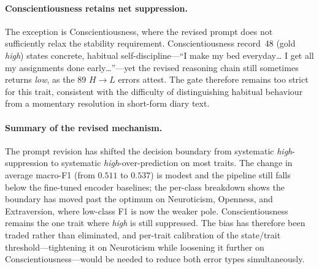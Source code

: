 \documentclass[../main.tex]{subfiles}
\begin{document}
\paragraph{Conscientiousness retains net suppression.}
The exception is Conscientiousness, where the revised prompt does not sufficiently
relax the stability requirement. Conscientiousness record~48 (gold \textit{high})
states concrete, habitual self-discipline---``I make my bed everyday\dots
I get all my assignments done early\dots''---yet the revised reasoning chain
still sometimes returns \textit{low}, as the $89$ $H{\to}L$ errors attest.
The gate therefore remains too strict for this trait, consistent with the
difficulty of distinguishing habitual behaviour from a momentary resolution
in short-form diary text.

\paragraph{Summary of the revised mechanism.}
The prompt revision has shifted the decision boundary from systematic
\textit{high}-suppression to systematic \textit{high}-over-prediction on most
traits. The change in average macro-F1 (from $0.511$ to $0.537$) is modest and
the pipeline still falls below the fine-tuned encoder baselines; the per-class
breakdown shows the boundary has moved past the optimum on Neuroticism, Openness,
and Extraversion, where low-class F1 is now the weaker pole. Conscientiousness
remains the one trait where \textit{high} is still suppressed. The bias has
therefore been traded rather than eliminated, and per-trait calibration of the
state/trait threshold---tightening it on Neuroticism while loosening it further
on Conscientiousness---would be needed to reduce both error types simultaneously.
\end{document}
